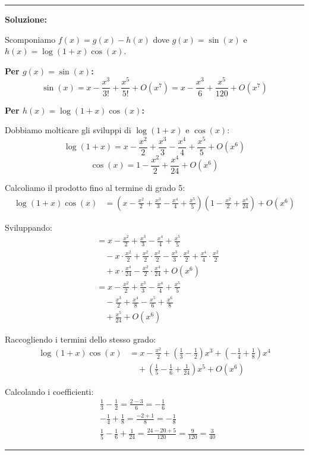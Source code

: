 \documentclass[12pt, a4paper]{article}
\newenvironment{solution}
{\par\noindent\rule{\textwidth}{0.4pt}\par\textbf{Soluzione:}\medskip\par}
{\par\rule{\textwidth}{0.4pt}\par\bigskip}
\begin{document}
\begin{solution}
Scomponiamo $f(x) = g(x) - h(x)$ dove $g(x) = \sin(x)$ e $h(x) = \log(1+x)\cos(x)$.

\textbf{Per $g(x) = \sin(x)$:}
\[
\sin(x) = x - \frac{x^3}{3!} + \frac{x^5}{5!} + O(x^7) = x - \frac{x^3}{6} + \frac{x^5}{120} + O(x^7)
\]

\textbf{Per $h(x) = \log(1+x)\cos(x)$:}

Dobbiamo molticare gli sviluppi di $\log(1+x)$ e $\cos(x)$:
\[
\log(1+x) = x - \frac{x^2}{2} + \frac{x^3}{3} - \frac{x^4}{4} + \frac{x^5}{5} + O(x^6)
\]
\[
\cos(x) = 1 - \frac{x^2}{2} + \frac{x^4}{24} + O(x^6)
\]

Calcoliamo il prodotto fino al termine di grado 5:
\begin{align}
\log(1+x)\cos(x) &= \left(x - \frac{x^2}{2} + \frac{x^3}{3} - \frac{x^4}{4} + \frac{x^5}{5}\right)\left(1 - \frac{x^2}{2} + \frac{x^4}{24}\right) + O(x^6)
\end{align}

Sviluppando:
\begin{align}
&= x - \frac{x^2}{2} + \frac{x^3}{3} - \frac{x^4}{4} + \frac{x^5}{5} \\
&\quad - x \cdot \frac{x^2}{2} + \frac{x^2}{2} \cdot \frac{x^2}{2} - \frac{x^3}{3} \cdot \frac{x^2}{2} + \frac{x^4}{4} \cdot \frac{x^2}{2} \\
&\quad + x \cdot \frac{x^4}{24} - \frac{x^2}{2} \cdot \frac{x^4}{24} + O(x^6) \\
&= x - \frac{x^2}{2} + \frac{x^3}{3} - \frac{x^4}{4} + \frac{x^5}{5} \\
&\quad - \frac{x^3}{2} + \frac{x^4}{8} - \frac{x^5}{6} + \frac{x^6}{8} \\
&\quad + \frac{x^5}{24} + O(x^6)
\end{align}

Raccogliendo i termini dello stesso grado:
\begin{align}
\log(1+x)\cos(x) &= x - \frac{x^2}{2} + \left(\frac{1}{3} - \frac{1}{2}\right)x^3 + \left(-\frac{1}{4} + \frac{1}{8}\right)x^4 \\
&\quad + \left(\frac{1}{5} - \frac{1}{6} + \frac{1}{24}\right)x^5 + O(x^6)
\end{align}

Calcolando i coefficienti:
\begin{align}
&\frac{1}{3} - \frac{1}{2} = \frac{2-3}{6} = -\frac{1}{6} \\
&-\frac{1}{4} + \frac{1}{8} = \frac{-2+1}{8} = -\frac{1}{8} \\
&\frac{1}{5} - \frac{1}{6} + \frac{1}{24} = \frac{24 - 20 + 5}{120} = \frac{9}{120} = \frac{3}{40}
\end{align}


\end{solution}
\end{document}
